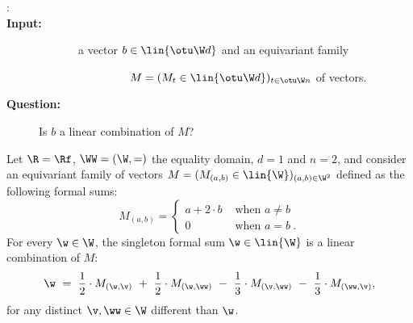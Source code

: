 \smallskip
\begin{description}                                                                                                                                                               
\item[:]           
\item[\bf Input: ] \ \ \ \ \ \ \ a vector $b\in\lin{\otu \W d}$ and an equivariant family
\item[] \ \ \ \ \ \ \ \ \ \ \ \ \ \ \ \  $M = (M_t\in \lin{\otu \W d})_{t\in\otu \W n}$ of vectors.
\item[\bf Question: ] Is $b$ a linear combination of $M$?
\end{description}                                                                                                                                                                 
%
%
\begin{slexample}
Let $\R=\Rf$, $\WW = (\W,=)$ the equality domain,
$d=1$ and $n=2$, and consider
an equivariant family of vectors $M = (M_{(a,b)} \in \lin{\W})_{(a,b)\in\W^2}$
defined as the following formal sums:
\[
M_{(a,b)} =
\begin{cases}
a + 2\cdot b & \text{ when } a \neq b \\
0 & \text{ when } a = b \ .
\end{cases}
\]
For every $\w\in\W$, the singleton formal sum $\w\in\lin{\W}$ 
is a linear combination of $M$:
\[
\w
\ = \ \frac 1 2 \cdot M_{(\w,\v)} \ + \ \frac 1 2 \cdot M_{(\w,\ww)} \ - \ 
\frac 1 3 \cdot M_{(\v,\ww)} \ - \ \frac 1 3 \cdot M_{(\ww,\v)},
\]
for any distinct $\v, \ww\in \W$ different than $\w$.
\end{slexample}
